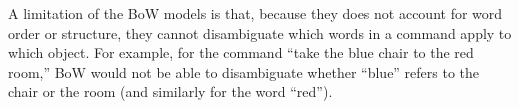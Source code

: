 \documentclass[conference]{IEEEtran}
\begin{document}
A limitation of the BoW models is that, because they does not account for word order or structure, they cannot disambiguate which words in a command apply to which object. For example, for the command ``take the blue chair to the red room,'' BoW would not be able to disambiguate whether ``blue'' refers to the chair or the room (and similarly for the word ``red'').


\end{document}
